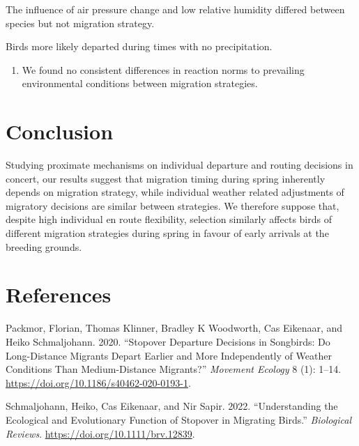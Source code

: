 \documentclass[
]{article}
\providecommand{\tightlist}{%
  \setlength{\itemsep}{0pt}\setlength{\parskip}{0pt}}
\newlength{\cslhangindent}
\newlength{\cslentryspacingunit} %
\newenvironment{CSLReferences}[2] %
 {%
  \setlength{\parindent}{0pt}
  \ifodd #1
  \let\oldpar\par
  \def\par{\hangindent=\cslhangindent\oldpar}
  \fi
  \setlength{\parskip}{#2\cslentryspacingunit}
 }%
 {}
\begin{document}
The influence of air pressure change and low relative humidity differed
between species but not migration strategy.

Birds more likely departed during times with no precipitation.



\begin{enumerate}
\def\labelenumi{\arabic{enumi}.}
\setcounter{enumi}{2}
\tightlist
\item
  We found no consistent differences in reaction norms to prevailing
  environmental conditions between migration strategies.
\end{enumerate}

\hypertarget{conclusion}{%
\section{Conclusion}\label{conclusion}}

Studying proximate mechanisms on individual departure and routing
decisions in concert, our results suggest that migration timing during
spring inherently depends on migration strategy, while individual
weather related adjustments of migratory decisions are similar between
strategies. We therefore suppose that, despite high individual en route
flexibility, selection similarly affects birds of different migration
strategies during spring in favour of early arrivals at the breeding
grounds.

\hypertarget{references}{%
\section{References}\label{references}}

\hypertarget{refs}{}
\begin{CSLReferences}{1}{0}
\leavevmode{}%
Packmor, Florian, Thomas Klinner, Bradley K Woodworth, Cas Eikenaar, and
Heiko Schmaljohann. 2020. {``Stopover Departure Decisions in Songbirds:
Do Long-Distance Migrants Depart Earlier and More Independently of
Weather Conditions Than Medium-Distance Migrants?''} \emph{Movement
Ecology} 8 (1): 1--14. \url{https://doi.org/10.1186/s40462-020-0193-1}.

\leavevmode{}%
Schmaljohann, Heiko, Cas Eikenaar, and Nir Sapir. 2022. {``Understanding
the Ecological and Evolutionary Function of Stopover in Migrating
Birds.''} \emph{Biological Reviews}.
\url{https://doi.org/10.1111/brv.12839}.

\end{CSLReferences}
\end{document}
